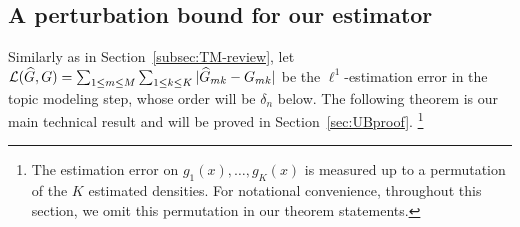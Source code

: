 \documentclass[preprint,11pt]{article}
\numberwithin{equation}{section}
\begin{document}








\subsection{A perturbation bound for our estimator} \label{subsec:main-bound}
Similarly as in Section~\ref{subsec:TM-review}, let ${\cal L}(\widehat{G}, G)=\sum_{1\leq m\leq M}\sum_{1\leq k\leq K}|\widehat{G}_{mk}-G_{mk}|$ be the $\ell^1$-estimation error in the topic modeling step, whose order will be $\delta_n$ below. 
The following theorem is our main technical result and will be proved in Section~\ref{sec:UBproof}. \footnote{The estimation error on $g_1(x), \ldots, g_K(x)$ is measured up to a permutation of the $K$ estimated densities. For notational convenience, throughout this section, we omit this permutation in our theorem statements.}
\end{document}
